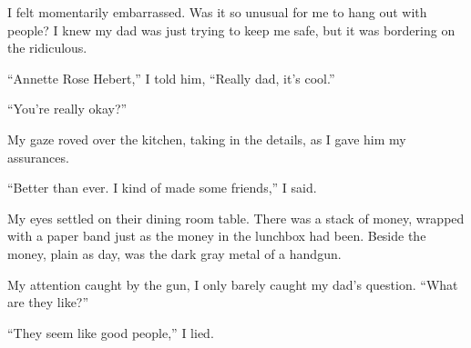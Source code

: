 I felt momentarily embarrassed.  Was it so unusual for me to hang out with people?  I knew my dad was just trying to keep me safe, but it was bordering on the ridiculous.



``Annette Rose Hebert,'' I told him, ``Really dad, it's cool.''



``You're really okay?''



My gaze roved over the kitchen, taking in the details, as I gave him my assurances.



``Better than ever.  I kind of made some friends,'' I said.



My eyes settled on their dining room table.  There was a stack of money, wrapped with a paper band just as the money in the lunchbox had been.  Beside the money, plain as day, was the dark gray metal of a handgun.



My attention caught by the gun, I only barely caught my dad's question.  ``What are they like?''



``They seem like good people,'' I lied.





